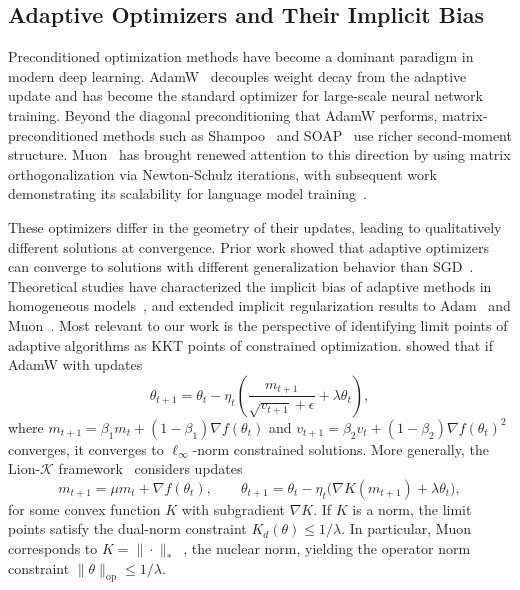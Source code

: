 \documentclass{article}
\begin{document}
\subsection{Adaptive Optimizers and Their Implicit Bias}
\label{sec:imbias}
Preconditioned optimization methods have become a dominant paradigm in modern deep learning. AdamW~\citep{loshchilov2019decoupledweightdecayregularization} decouples weight decay from the adaptive update and has become the standard optimizer for large-scale neural network training. Beyond the diagonal preconditioning that AdamW performs, matrix-preconditioned methods such as Shampoo~\citep{gupta2018shampoopreconditionedstochastictensor} and SOAP~\citep{vyas2025soapimprovingstabilizingshampoo} use richer second-moment structure. Muon~\citep{jordan2024muon} has brought renewed attention to this direction by using matrix orthogonalization via Newton-Schulz iterations, with subsequent work demonstrating its scalability for language model training~\citep{liu2025muonscalablellmtraining,ai2025practicalefficiencymuonpretraining,kimiteam2025kimik2openagentic}.


These optimizers differ in the geometry of their updates, leading to qualitatively different solutions at convergence. Prior work showed that adaptive optimizers can converge to solutions with different generalization behavior than SGD~\citep{wilson2017marginal}. Theoretical studies have characterized the implicit bias of adaptive methods in homogeneous models~\citep{wang2021implicit}, and extended implicit regularization results to Adam~\citep{cattaneo2023implicit} and Muon~\citep{fan2025implicitbiasspectraldescent}. Most relevant to our work is the perspective of identifying limit points of adaptive algorithms as KKT points of constrained optimization. \citet{xie2024implicitbiasadamwellinfty} showed that if AdamW with updates
\[
\theta_{t+1}
=
\theta_t-\eta_t\!\left(
\frac{m_{t+1}}{\sqrt{v_{t+1}}+\epsilon}
+\lambda \theta_t
\right),
\]
where $m_{t+1}=\beta_1 m_t+(1-\beta_1)\nabla f(\theta_t)$ and $v_{t+1}=\beta_2 v_t+(1-\beta_2)\nabla f(\theta_t)^{2}$ converges, it converges to $\ell_\infty$-norm constrained solutions. More generally, the Lion-$\mathcal{K}$ framework~\citep{chen2025lionsecretlysolvesconstrained} considers updates
\[
m_{t+1} = \mu m_t + \nabla f(\theta_t), \qquad
\theta_{t+1}
=
\theta_t
-
\eta_t\big(\nabla K(m_{t+1}) + \lambda \theta_t\big),
\]
for some convex function $K$ with subgradient $\nabla K$. If $K$ is a norm, the limit points satisfy the dual-norm constraint $K_d(\theta) \le 1/\lambda$. In particular, Muon corresponds to $K = \|\cdot\|_*$~\citep{chen2025muonoptimizesspectralnorm}, the nuclear norm, yielding the operator norm constraint $\|\theta\|_{\mathrm{op}} \le 1/\lambda$.
\end{document}

